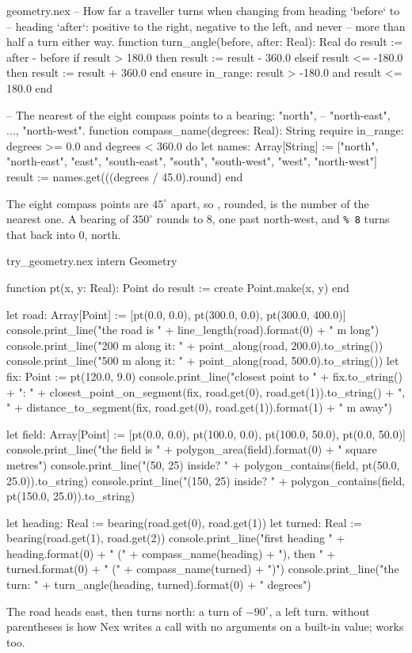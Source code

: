\begin{append}{geometry.nex}
-- How far a traveller turns when changing from heading `before` to
-- heading `after`: positive to the right, negative to the left, and never
-- more than half a turn either way.
function turn_angle(before, after: Real): Real do
  result := after - before
  if result > 180.0 then
    result := result - 360.0
  elseif result <= -180.0 then
    result := result + 360.0
  end
ensure
  in_range: result > -180.0 and result <= 180.0
end

-- The nearest of the eight compass points to a bearing: "north",
-- "north-east", ..., "north-west".
function compass_name(degrees: Real): String
require
  in_range: degrees >= 0.0 and degrees < 360.0
do
  let names: Array[String] := ["north", "north-east", "east", "south-east",
    "south", "south-west", "west", "north-west"]
  result := names.get(((degrees / 45.0).round) %
end
\end{append}

The eight compass points are $45^\circ$ apart, so ,
rounded, is the number of the nearest one. A bearing of $350^\circ$ rounds
to 8, one past north-west, and \texttt{\% 8} turns that back into 0, north.

\begin{tryit}{try_geometry.nex}
intern Geometry

function pt(x, y: Real): Point do
  result := create Point.make(x, y)
end

let road: Array[Point] := [pt(0.0, 0.0), pt(300.0, 0.0), pt(300.0, 400.0)]
console.print_line("the road is " + line_length(road).format(0) + " m long")
console.print_line("200 m along it: " + point_along(road, 200.0).to_string())
console.print_line("500 m along it: " + point_along(road, 500.0).to_string())
let fix: Point := pt(120.0, 9.0)
console.print_line("closest point to " + fix.to_string() + ": "
  + closest_point_on_segment(fix, road.get(0), road.get(1)).to_string()
  + ", " + distance_to_segment(fix, road.get(0), road.get(1)).format(1) + " m away")

let field: Array[Point] := [pt(0.0, 0.0), pt(100.0, 0.0), pt(100.0, 50.0), pt(0.0, 50.0)]
console.print_line("the field is " + polygon_area(field).format(0) + " square metres")
console.print_line("(50, 25) inside? " + polygon_contains(field, pt(50.0, 25.0)).to_string)
console.print_line("(150, 25) inside? " + polygon_contains(field, pt(150.0, 25.0)).to_string)

let heading: Real := bearing(road.get(0), road.get(1))
let turned: Real := bearing(road.get(1), road.get(2))
console.print_line("first heading " + heading.format(0) + " (" + compass_name(heading) + "), then "
  + turned.format(0) + " (" + compass_name(turned) + ")")
console.print_line("the turn: " + turn_angle(heading, turned).format(0) + " degrees")
\end{tryit}

The road heads east, then turns north: a turn of $-90^\circ$, a left turn.
 without parentheses is how Nex writes a call with no
arguments on a built-in value;  works too.
